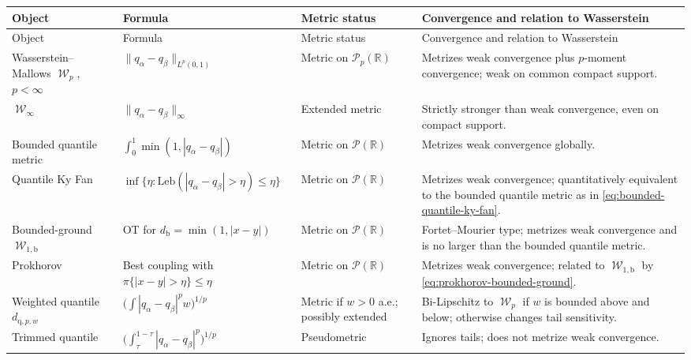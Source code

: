 \documentclass[11pt]{article}
\newcommand{\RR}{\mathbb R}
\newcommand{\Pp}{\mathcal P}
\newcommand{\al}{\alpha}
\newcommand{\be}{\beta}
\DeclareMathOperator{\Wass}{\mathcal W}
\begin{document}
\renewcommand{\arraystretch}{1.25}
\begin{longtable}{@{}>{\raggedright\arraybackslash}p{}
                  >{\raggedright\arraybackslash}p{}
                  >{\raggedright\arraybackslash}p{}
                  >{\raggedright\arraybackslash}p{}@{}}
\toprule
Object & Formula & Metric status & Convergence and relation to Wasserstein \\
\midrule
\endfirsthead
\toprule
Object & Formula & Metric status & Convergence and relation to Wasserstein \\
\midrule
\endhead
Wasserstein--Mallows $\Wass_p$, $p<\infty$
& $\|q_\al-q_\be\|_{L^p(0,1)}$
& Metric on $\Pp_p(\RR)$
& Metrizes weak convergence plus $p$-moment convergence; weak on common compact support. \\

$\Wass_\infty$
& $\|q_\al-q_\be\|_\infty$
& Extended metric
& Strictly stronger than weak convergence, even on compact support. \\

Bounded quantile metric
& $\int_0^1\min(1,|q_\al-q_\be|)$
& Metric on $\Pp(\RR)$
& Metrizes weak convergence globally. \\

Quantile Ky Fan
& $\inf\{\eta:\mathrm{Leb}(|q_\al-q_\be|>\eta)\leq\eta\}$
& Metric on $\Pp(\RR)$
& Metrizes weak convergence; quantitatively equivalent to the bounded quantile metric as in \eqref{eq:bounded-quantile-ky-fan}. \\

Bounded-ground $\Wass_{1,\mathrm b}$
& OT for $d_{\mathrm b}=\min(1,|x-y|)$
& Metric on $\Pp(\RR)$
& Fortet--Mourier type; metrizes weak convergence and is no larger than the bounded quantile metric. \\

Prokhorov
& Best coupling with $\pi\{|x-y|>\eta\}\leq\eta$
& Metric on $\Pp(\RR)$
& Metrizes weak convergence; related to $\Wass_{1,\mathrm b}$ by \eqref{eq:prokhorov-bounded-ground}. \\

Weighted quantile $d_{\mathrm{q},p,w}$
& $\big(\int|q_\al-q_\be|^p w\big)^{1/p}$
& Metric if $w>0$ a.e.; possibly extended
& Bi-Lipschitz to $\Wass_p$ if $w$ is bounded above and below; otherwise changes tail sensitivity. \\

Trimmed quantile
& $\big(\int_\tau^{1-\tau}|q_\al-q_\be|^p\big)^{1/p}$
& Pseudometric
& Ignores tails; does not metrize weak convergence. \\


\end{longtable}
\end{document}

